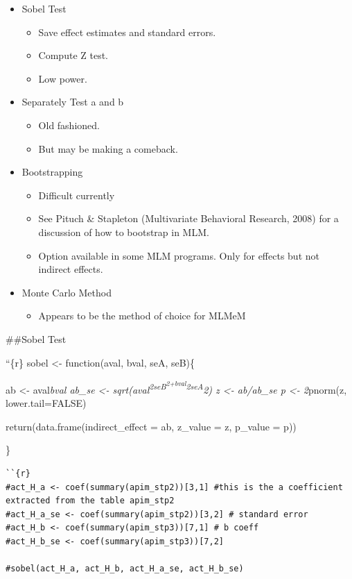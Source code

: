 \documentclass[
  man,floatsintext]{apa6}
\providecommand{\tightlist}{%
  \setlength{\itemsep}{0pt}\setlength{\parskip}{0pt}}
\begin{document}
\begin{itemize}
\tightlist
\item
  Sobel Test

  \begin{itemize}
  \tightlist
  \item
    Save effect estimates and standard errors.
  \item
    Compute Z test.
  \item
    Low power.
  \end{itemize}
\item
  Separately Test a and b

  \begin{itemize}
  \tightlist
  \item
    Old fashioned.
  \item
    But may be making a comeback.
  \end{itemize}
\item
  Bootstrapping

  \begin{itemize}
  \tightlist
  \item
    Difficult currently
  \item
    See Pituch \& Stapleton (Multivariate Behavioral Research, 2008) for a discussion of how to bootstrap in MLM.
  \item
    Option available in some MLM programs. Only for effects but not indirect effects.
  \end{itemize}
\item
  Monte Carlo Method

  \begin{itemize}
  \tightlist
  \item
    Appears to be the method of choice for MLMeM
  \end{itemize}
\end{itemize}

\#\#Sobel Test

``\{r\}
sobel \textless- function(aval, bval, seA, seB)\{

ab \textless- aval\emph{bval
ab\_se \textless- sqrt(aval\textsuperscript{2\emph{seB\textsuperscript{2+bval}2}seA}2)
z \textless- ab/ab\_se
p \textless- 2}pnorm(z, lower.tail=FALSE)

return(data.frame(indirect\_effect = ab, z\_value = z, p\_value = p))

\}

\begin{verbatim}
``{r}
#act_H_a <- coef(summary(apim_stp2))[3,1] #this is the a coefficient extracted from the table apim_stp2 
#act_H_a_se <- coef(summary(apim_stp2))[3,2] # standard error 
#act_H_b <- coef(summary(apim_stp3))[7,1] # b coeff
#act_H_b_se <- coef(summary(apim_stp3))[7,2]

#sobel(act_H_a, act_H_b, act_H_a_se, act_H_b_se)
\end{verbatim}
\end{document}
